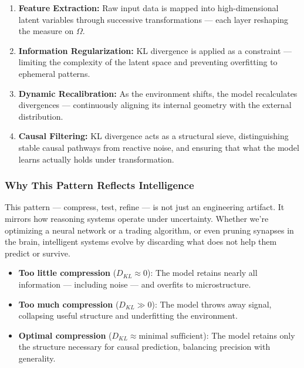 \begin{enumerate}
    \item \textbf{Feature Extraction:} Raw input data is mapped into high-dimensional latent variables through successive transformations — each layer reshaping the measure on \( \Omega \).
    
    \item \textbf{Information Regularization:} KL divergence is applied as a constraint — limiting the complexity of the latent space and preventing overfitting to ephemeral patterns.
    
    \item \textbf{Dynamic Recalibration:} As the environment shifts, the model recalculates divergences — continuously aligning its internal geometry with the external distribution.
    
    \item \textbf{Causal Filtering:} KL divergence acts as a structural sieve, distinguishing stable causal pathways from reactive noise, and ensuring that what the model learns actually holds under transformation.
\end{enumerate}

\subsubsection{Why This Pattern Reflects Intelligence}

This pattern — compress, test, refine — is not just an engineering artifact. It mirrors how reasoning systems operate under uncertainty. Whether we’re optimizing a neural network or a trading algorithm, or even pruning synapses in the brain, intelligent systems evolve by discarding what does not help them predict or survive.

\begin{itemize}
    \item \textbf{Too little compression} (\( D_{KL} \approx 0 \)): The model retains nearly all information — including noise — and overfits to microstructure.
    
    \item \textbf{Too much compression} (\( D_{KL} \gg 0 \)): The model throws away signal, collapsing useful structure and underfitting the environment.
    
    \item \textbf{Optimal compression} (\( D_{KL} \approx \text{minimal sufficient} \)): The model retains only the structure necessary for causal prediction, balancing precision with generality.
\end{itemize}


